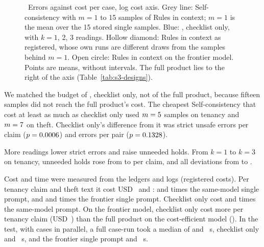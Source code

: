 \begin{figure}[t]
\centering
{}
\caption{\dag\ Errors against cost per case, log cost axis. Grey line: Self-consistency with $m=1$ to 15 samples of Rules in context; $m=1$ is the mean over the 15 stored single samples. Blue: \casepath, checklist only, with $k=1$, 2, 3 readings. Hollow diamond: Rules in context as registered, whose own runs are different draws from the samples behind $m=1$. Open circle: Rules in context on the frontier model. Points are means, without intervals. The full product lies to the right of the axis (Table~\ref{tab:s3-designs}).}
\label{fig:budget}
\end{figure}

We matched the budget of \casepath, checklist only, not of the full product, because fifteen samples did not reach the full product's cost. The cheapest Self-consistency that cost at least as much as checklist only used $m=5$ samples on tenancy and $m=7$ on theft. Checklist only's difference from it was \sthreeFFourTenBudgetChecklistDiff{} strict unsafe errors per claim ($p=0.0006$) and \sthreeFFourThBudgetChecklistDiff{} errors per pair ($p=0.1328$).

More readings lower strict errors and raise unneeded holds. From $k=1$ to $k=3$ on tenancy, unneeded holds rose from \sthreeFFourTenKOneSpurHold{} to \sthreeFFourTenKThreeSpurHold{} per claim, and all deviations from \sthreeFFourTenKOneAllDev{} to \sthreeFFourTenKThreeAllDev.

Cost and time were measured from the ledgers and logs (registered costs). Per tenancy claim and theft text it cost USD~\sthreeCasePathTenCost{} and \sthreeCasePathThCost: \sthreeFCostCasePathTenOverSame{} and \sthreeFCostCasePathThOverSame{} times the same-model single prompt, and \sthreeCasePathTenRatio{} and \sthreeCasePathThRatio{} times the frontier single prompt. Checklist only cost \sthreeFCostChecklistTenOverSame{} and \sthreeFCostChecklistThOverSame{} times the same-model prompt. On the frontier model, checklist only cost more per tenancy claim (USD~\sthreeFrontierChecklistTenCostFour) than the full product on the cost-efficient model (\sthreeCasePathTenCostFour). In the test, with \sthreeRunWorkersLater{} cases in parallel, a full case-run took a median of \sthreeRTenCasePathTenMedian{} and \sthreeRTenCasePathThMedian~s, checklist only \sthreeRTenChecklistTenMedian{} and \sthreeRTenChecklistThMedian~s, and the frontier single prompt \sthreeRTenRicFrontierTenMedian{} and \sthreeRTenRicFrontierThMedian~s.

